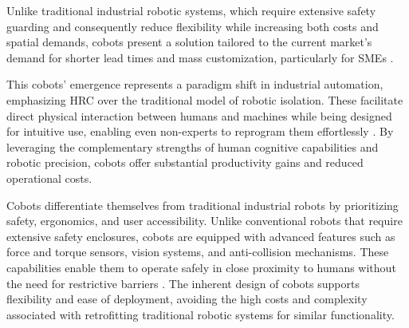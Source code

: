 Unlike traditional industrial robotic systems, which require extensive safety guarding and consequently reduce flexibility while increasing both costs and spatial demands, cobots present a solution tailored to the current market's demand for shorter lead times and mass customization, particularly for \ac{SMEs} \cite{barbazza2017agility}.

This cobots' emergence represents a paradigm shift in industrial automation, emphasizing \ac{HRC} over the traditional model of robotic isolation. These facilitate direct physical interaction between humans and machines while being designed for intuitive use, enabling even non-experts to reprogram them effortlessly \cite{7140065}. By leveraging the complementary strengths of human cognitive capabilities and robotic precision, cobots offer substantial productivity gains and reduced operational costs.





Cobots differentiate themselves from traditional industrial robots by prioritizing safety, ergonomics, and user accessibility. Unlike conventional robots that require extensive safety enclosures, cobots are equipped with advanced features such as force and torque sensors, vision systems, and anti-collision mechanisms. These capabilities enable them to operate safely in close proximity to humans without the need for restrictive barriers \cite{cobots-design}. The inherent design of cobots supports flexibility and ease of deployment, avoiding the high costs and complexity associated with retrofitting traditional robotic systems for similar functionality.



